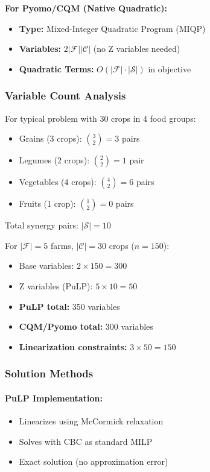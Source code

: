 \documentclass[11pt,a4paper]{article}
\begin{document}
\textbf{For Pyomo/CQM (Native Quadratic):}
\begin{itemize}
    \item \textbf{Type:} Mixed-Integer Quadratic Program (MIQP)
    \item \textbf{Variables:} $2|\mathcal{F}||\mathcal{C}|$ (no Z variables needed)
    \item \textbf{Quadratic Terms:} $O(|\mathcal{F}| \cdot |\mathcal{S}|)$ in objective
\end{itemize}

\subsubsection{Variable Count Analysis}

For typical problem with 30 crops in 4 food groups:
\begin{itemize}
    \item Grains (3 crops): $\binom{3}{2} = 3$ pairs
    \item Legumes (2 crops): $\binom{2}{2} = 1$ pair
    \item Vegetables (4 crops): $\binom{4}{2} = 6$ pairs
    \item Fruits (1 crop): $\binom{1}{2} = 0$ pairs
\end{itemize}

Total synergy pairs: $|\mathcal{S}| = 10$

For $|\mathcal{F}| = 5$ farms, $|\mathcal{C}| = 30$ crops ($n = 150$):
\begin{itemize}
    \item Base variables: $2 \times 150 = 300$
    \item Z variables (PuLP): $5 \times 10 = 50$
    \item \textbf{PuLP total:} 350 variables
    \item \textbf{CQM/Pyomo total:} 300 variables
    \item \textbf{Linearization constraints:} $3 \times 50 = 150$
\end{itemize}

\subsubsection{Solution Methods}

\paragraph{PuLP Implementation:}
\begin{itemize}
    \item Linearizes using McCormick relaxation
    \item Solves with CBC as standard MILP
    \item Exact solution (no approximation error)
\end{itemize}
\end{document}
